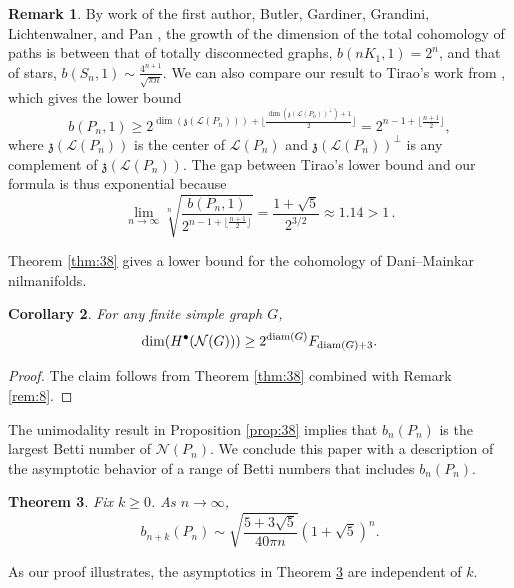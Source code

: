 \documentclass[12pt]{amsart}
\newtheorem{theorem}{Theorem}[section]
\newtheorem{cor}[theorem]{Corollary}
\theoremstyle{definition}
\newtheorem{rem}[theorem]{Remark}
\begin{document}
\begin{rem} By work of the first author, Butler, Gardiner, Grandini, Lichtenwalner, and Pan \cite{ABGGLP}, the growth of the dimension of the total cohomology of paths is between that of totally disconnected graphs, $b(nK_1,1)=2^n$, and that of stars, $b(S_n,1)\sim \frac{4^{n+1}}{\sqrt{\pi n}}$. We can also compare our result to Tirao's work from \cite{Tirao00}, which gives the lower bound
\[b(P_n,1)\geq 2^{\dim(\mathfrak z (\mathcal L(P_n)))+\lfloor \frac{\dim(\mathfrak z (\mathcal L(P_n))^\perp)+1}{2}\rfloor}=2^{n-1+\lfloor\frac{n+1}{2}\rfloor},\]
where $\mathfrak z (\mathcal L(P_n))$ is the center of $\mathcal L(P_n)$ and $\mathfrak z (\mathcal L(P_n))^{\perp}$ is any complement of $\mathfrak z (\mathcal L(P_n))$. The gap between Tirao's lower bound and our formula is thus exponential because
\[
\lim_{n\to \infty} \sqrt[n]{\frac{b(P_n,1) }{2^{n-1+\lfloor\frac{n+1}{2}\rfloor}}}= \frac{1+\sqrt{5}}{2^{3/2}}\approx 1.14>1\,.
\]
\end{rem}

Theorem \ref{thm:38} gives a lower bound for the cohomology of Dani--Mainkar nilmanifolds.

\begin{cor}
For any finite simple graph $G$,
\[
\dim(H^\bullet(\mathcal N(G)))\ge 2^{{\rm diam}(G)}F_{{\rm diam}(G)+3}.
\]
\end{cor}

\begin{proof}
The claim follows from Theorem \ref{thm:38} combined with Remark \ref{rem:8}.
\end{proof}

The unimodality result in Proposition \ref{prop:38} implies that $b_n(P_n)$ is the largest Betti number of $\mathcal N(P_n)$. We conclude this paper with a description of the asymptotic behavior of a range of Betti numbers that includes $b_n(P_n)$.

\begin{theorem}\label{rangebetti}
Fix $k\geq 0$. As $n\to \infty$, 
\[
b_{n+k}(P_{n})\sim \sqrt{\frac{5+3\sqrt{5}}{40\pi n}}(1+\sqrt{5})^n.
\]
\end{theorem}

As our proof illustrates, the asymptotics in Theorem \ref{rangebetti} are independent of $k$.
\end{document}
